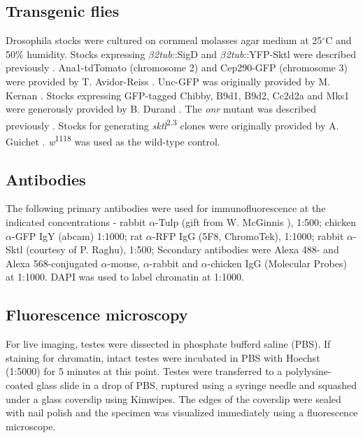 \documentclass[12pt, twoside, letterpaper]{article}
\begin{document}
\subsection{Transgenic flies}
Drosophila stocks were cultured on cornmeal molasses agar medium at 25$^{\circ}$C
and 50\% humidity.
Stocks expressing $\beta$\textit{2tub}::SigD and $\beta$\textit{2tub}::YFP-Sktl
were described previously \citep{wei2008depletion, fabian2010phosphatidylinositol}.
Ana1-tdTomato (chromosome 2) and Cep290-GFP (chromosome 3) were provided
by T. Avidor-Reiss \citep{basiri2014migrating}.
Unc-GFP was originally provided by M. Kernan \citep{baker2004mechanosensory}.
Stocks expressing GFP-tagged Chibby, B9d1, B9d2, Cc2d2a and Mks1 were generously
provided by B. Durand \citep{enjolras2012drosophila, vieillard2016transition}.
The \textit{onr} mutant was described previously \citep{giansanti2015exocyst}.
Stocks for generating \textit{sktl}\textsuperscript{2.3} clones were originally provided by
A. Guichet \citep{gervais2008pip5k}.
\textit{w}\textsuperscript{1118} was used as the wild-type control.

\subsection{Antibodies}
The following primary antibodies were used for immunofluorescence
at the indicated concentrations - 
rabbit $\alpha$-Tulp (gift from W. McGinnis \citep{ronshaugen2002structure}), 1:500; 
chicken $\alpha$-GFP IgY (abcam) 1:1000;
rat $\alpha$-RFP IgG (5F8, ChromoTek), 1:1000;
rabbit $\alpha$-Sktl (courtesy of P. Raghu), 1:500;
Secondary antibodies were Alexa 488- and Alexa 568-conjugated
$\alpha$-mouse, $\alpha$-rabbit and $\alpha$-chicken
IgG (Molecular Probes) at 1:1000.
DAPI was used to label chromatin at 1:1000.

\subsection{Fluorescence microscopy}
For live imaging, testes were dissected in phosphate bufferd saline (PBS).
If staining for chromatin, intact testes were incubated in PBS with
Hoechst (1:5000) for 5 minutes at this point.
Testes were transferred to a polylysine-coated glass slide in a drop of PBS,
ruptured using a syringe needle and
squashed under a glass coverslip using Kimwipes.
The edges of the coverslip were sealed with nail polish
and the specimen was visualized immediately using a fluorescence microscope.
\end{document}

